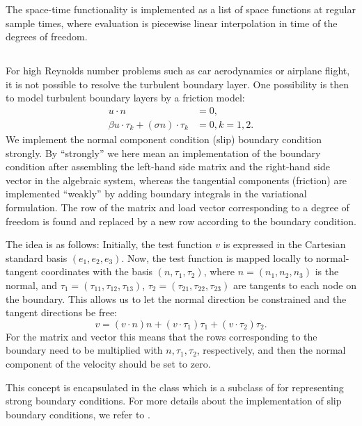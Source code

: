 The space-time functionality is implemented as a list of space
functions at regular sample times, where evaluation is piecewise
linear interpolation in time of the degrees of freedom.

\subsection{}

For high Reynolds number problems such as car aerodynamics or airplane
flight, it is not possible to resolve the turbulent boundary
layer. One possibility is then to model turbulent boundary layers by a
friction model:
\begin{align}
u \cdot n &= 0,
\\
\beta u \cdot \tau_k + (\sigma n) \cdot \tau_k &= 0, k = 1, 2.
\end{align}
We implement the normal component condition (slip) boundary condition
strongly. By ``strongly'' we here mean an implementation of the
boundary condition after assembling the left-hand side matrix and the
right-hand side vector in the algebraic system, whereas the tangential
components (friction) are implemented ``weakly'' by adding boundary
integrals in the variational formulation. The row of the matrix and
load vector corresponding to a degree of freedom is found and replaced
by a new row according to the boundary condition.

The idea is as follows: Initially, the test function $v$ is expressed
in the Cartesian standard basis $(e_1, e_2, e_3)$.  Now, the test
function is mapped locally to normal-tangent coordinates with the
basis $(n, \tau_1, \tau_2)$, where $n = (n_1, n_2, n_3)$ is the
normal, and $\tau_1 = (\tau_{11}, \tau_{12}, \tau_{13})$, $\tau_2 =
(\tau_{21}, \tau_{22}, \tau_{23})$ are tangents to each node on the
boundary. This allows us to let the normal direction be constrained
and the tangent directions be free:
\begin{equation}
  v = (v \cdot n)n + (v \cdot \tau_1) \tau_1 + (v \cdot \tau_2) \tau_2.
\end{equation}
For the matrix and vector this means that the rows corresponding to the
boundary need to be multiplied with $n,\tau_1,\tau_2$, respectively,
and then the normal component of the velocity should be set to zero.

This concept is encapsulated in the class  which is a
subclass of  for representing strong
boundary conditions. For more details about the implementation of slip
boundary conditions, we refer to \citet{Nazarov2011}.

